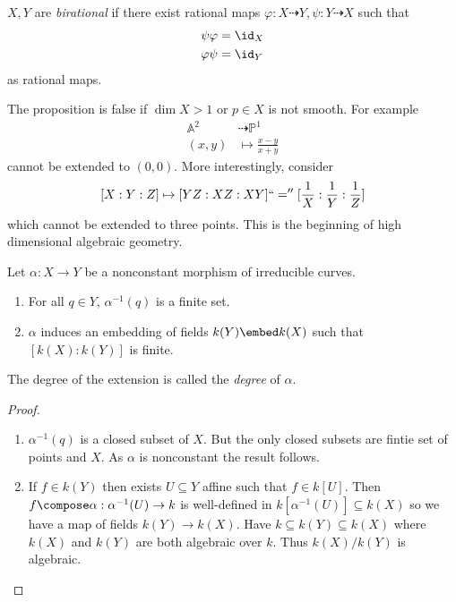 \documentclass[a4paper]{article}
\renewcommand{\A}{\mathbb{A}}
\renewcommand*{\P}{\mathbb{P}}
\newcommand{\rational}{\dashrightarrow} %
\begin{document}
\begin{definition}
  \(X, Y\) are \emph{birational} if there exist rational maps \(\varphi: X \rational Y, \psi: Y \rational X\) such that
  \begin{align*}
    \psi \varphi &= \id_X \\
    \varphi \psi &= \id_Y
  \end{align*}
  as rational maps.
\end{definition}

\begin{remark}
  The proposition is false if \(\dim X > 1\) or \(p \in X\) is not smooth. For example
  \begin{align*}
    \A^2 &\rational \P^1 \\
    (x, y) &\mapsto \frac{x - y}{x + y}
  \end{align*}
  cannot be extended to \((0, 0)\). More interestingly, consider
  \[
    [X: Y: Z] \mapsto [YZ: XZ: XY] ``='' [\frac{1}{X} : \frac{1}{Y}: \frac{1}{Z}]
  \]
  which cannot be extended to three points. This is the beginning of high dimensional algebraic geometry.
\end{remark}

\begin{proposition}
  Let \(\alpha: X \to Y\) be a nonconstant morphism of irreducible curves.
  \begin{enumerate}
  \item For all \(q \in Y\), \(\alpha^{-1}(q)\) is a finite set.
  \item \(\alpha\) induces an embedding of fields \(k(Y) \embed k(X)\) such that \([k(X): k(Y)]\) is finite.
  \end{enumerate}
\end{proposition}

\begin{definition}[degree]
  The degree of the extension is called the \emph{degree} of \(\alpha\).
\end{definition}

\begin{proof}\leavevmode
  \begin{enumerate}
  \item \(\alpha^{-1}(q)\) is a closed subset of \(X\). But the only closed subsets are fintie set of points and \(X\). As \(\alpha\) is nonconstant the result follows.
  \item If \(f \in k(Y)\) then exists \(U \subseteq Y\) affine such that \(f \in k[U]\). Then \(f \compose \alpha: \alpha^{-1}(U) \to k\) is well-defined in \(k[\alpha^{-1}(U)] \subseteq k(X)\) so we have a map of fields \(k(Y) \to k(X)\). Have \(k \subseteq k(Y) \subseteq k(X)\) where \(k(X)\) and \(k(Y)\) are both algebraic over \(k\). Thus \(k(X)/k(Y)\) is algebraic.
  \end{enumerate}
\end{proof}
\end{document}
